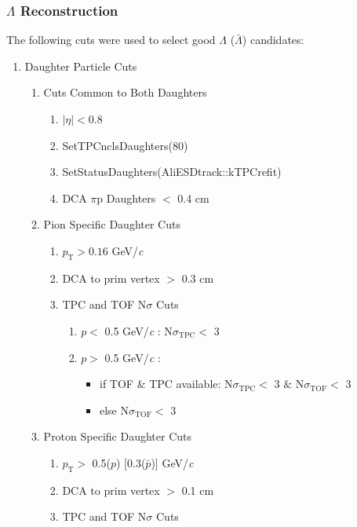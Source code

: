\documentclass[../AnalysisNoteJBuxton.tex]{subfiles}
\begin{document}
\subsubsection{\texorpdfstring{$\Lambda$}{TEXT} Reconstruction}
\label{LambdaReconstruction}

The following cuts were used to select good $\Lambda$ ($\bar{\Lambda}$) candidates:

\begin{enumerate}
 \item Daughter Particle Cuts
 \begin{enumerate}
  \item{Cuts Common to Both Daughters}
  \begin{enumerate}
   \item $|\eta| < 0.8$
   \item SetTPCnclsDaughters(80)
   \item SetStatusDaughters(AliESDtrack::kTPCrefit)
   \item DCA $\pi$p Daughters $<$ 0.4 cm
  \end{enumerate}
  \item Pion Specific Daughter Cuts 
  \begin{enumerate}
   \item $p_{\mathrm{T}} > 0.16$ GeV/\textit{c}
   \item DCA to prim vertex $>$ 0.3 cm
   \item TPC and TOF N$\sigma$ Cuts
   \begin{enumerate}
    \item $p <$ 0.5 GeV/\textit{c} : N$\sigma_{\mathrm{TPC}} <$ 3
    \item $p >$ 0.5 GeV/\textit{c} :
    \begin{itemize}
     \item if TOF \& TPC available: N$\sigma_{\mathrm{TPC}} <$ 3 \& N$\sigma_{\mathrm{TOF}} <$ 3
     \item else N$\sigma_{\mathrm{TOF}} <$ 3
    \end{itemize}
   \end{enumerate}
  \end{enumerate}
  \item Proton Specific Daughter Cuts
  \begin{enumerate}
   \item $p_{\mathrm{T}} > $ 0.5($p$) [0.3($\bar{p}$)] GeV/\textit{c}
   \item DCA to prim vertex $>$ 0.1 cm
   \item TPC and TOF N$\sigma$ Cuts
   \begin{enumerate}

\end{enumerate}
\end{enumerate}
\end{enumerate}
\end{enumerate}
\end{document}
